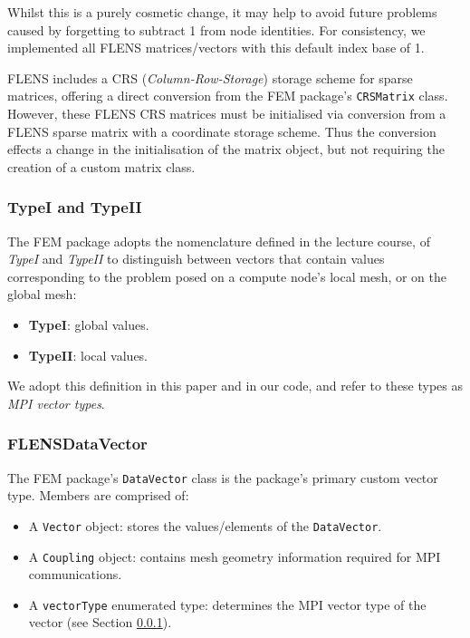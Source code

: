 Whilst this is a purely cosmetic change, it may help to avoid future problems caused by forgetting to subtract 1 from node identities. For consistency, we implemented all FLENS matrices/vectors with this default index base of 1.

FLENS includes a CRS (\emph{Column-Row-Storage}) storage scheme for sparse matrices, offering a direct conversion from the FEM package's \texttt{CRSMatrix} class. However, these FLENS CRS matrices must be initialised via conversion from a FLENS sparse matrix with a coordinate storage scheme. Thus the conversion effects a change in the initialisation of the matrix object, but not requiring the creation of a custom matrix class.

\subsubsection{TypeI and TypeII}\label{subsc:typeI_II}

The FEM package adopts the nomenclature defined in the lecture course, of \emph{TypeI} and \emph{TypeII} to distinguish between vectors that contain values corresponding to the problem posed on a compute node's local mesh, or on the global mesh:

\begin {itemize}
   \item \textbf{TypeI}: global values.
   \item \textbf{TypeII}: local values.
\end{itemize}

We adopt this definition in this paper and in our code, and refer to these types as \emph{MPI vector types}.

\subsubsection{FLENSDataVector}

The FEM package's \texttt{DataVector} class is the package's primary custom vector type. Members are comprised of:
\begin{itemize}
   \item A \texttt{Vector} object: stores the values/elements of the \texttt{DataVector}.
   \item A \texttt{Coupling} object: contains mesh geometry information required for MPI communications.
   \item A \texttt{vectorType} enumerated type: determines the MPI vector type of the vector (see Section \ref{subsc:typeI_II}).
\end{itemize}

